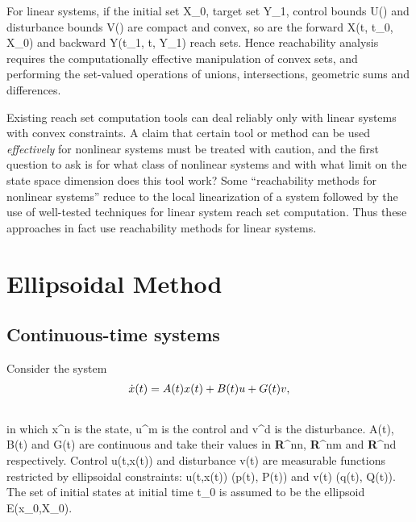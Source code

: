 \documentclass[letterpaper,10pt,english]{sphinxmanual}
\begin{document}
For linear systems, if the initial set {\mathcal X}_0, target
set {\mathcal Y}_1, control bounds {\mathcal U}(\cdot)
and disturbance bounds {\mathcal V}(\cdot) are compact and
convex, so are the forward {\mathcal X}(t, t_0, {\mathcal X}_0)
and backward {\mathcal Y}(t_1, t, {\mathcal Y}_1) reach sets.
Hence reachability analysis requires the computationally effective
manipulation of convex sets, and performing the set-valued operations of
unions, intersections, geometric sums and differences.

Existing reach set computation tools can deal reliably only with linear
systems with convex constraints. A claim that certain tool or method can
be used \emph{effectively} for nonlinear systems must be treated with
caution, and the first question to ask is for what class of nonlinear
systems and with what limit on the state space dimension does this tool
work? Some “reachability methods for nonlinear systems” reduce to the
local linearization of a system followed by the use of well-tested
techniques for linear system reach set computation. Thus these
approaches in fact use reachability methods for linear systems.


\section{Ellipsoidal Method}
\label{chap_reach:ellipsoidal-method}

\subsection{Continuous-time systems}
\label{chap_reach:continuous-time-systems}
Consider the system
\begin{gather}
\begin{split}\dot{x}(t) = A(t)x(t) + B(t)u + G(t)v, \label{ctsystem}\end{split}\notag\\\begin{split}\end{split}\notag
\end{gather}
in which x^n is the state, u^m is
the control and v^d is the disturbance. A(t),
B(t) and G(t) are continuous and take their values in
{\bf R}^{n\times n}, {\bf R}^{n\times m} and
{\bf R}^{n\times d} respectively. Control u(t,x(t)) and
disturbance v(t) are measurable functions restricted by
ellipsoidal constraints: u(t,x(t)) (p(t), P(t))
and v(t) (q(t), Q(t)). The set of initial states
at initial time t_0 is assumed to be the ellipsoid
{\mathcal E}(x_0,X_0).
\end{document}
